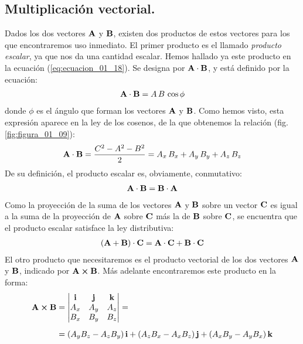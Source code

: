 \documentclass[12pt]{article}
\begin{document}
\subsection{Multiplicación vectorial.}

Dados los dos vectores $\vb{A}$ y $\vb{B}$, existen dos productos de estos vectores para los que encontraremos uso inmediato. El primer producto es el llamado \emph{producto escalar}, ya que nos da una cantidad escalar. Hemos hallado ya este producto en la ecuación (\ref{eq:ecuacion_01_18}). Se designa por $\vb{A} \cdot \vb{B}$, y está definido por la ecuación:
\begin{align}
    \vb{A} \cdot \vb{B} = A \, B \, \cos \phi
    \label{eq:ecuacion_01_20}
\end{align}
donde $\phi$ es el ángulo que forman los vectores $\vb{A}$ y $\vb{B}$. Como hemos visto, esta expresión aparece en la ley de los cosenos, de la que obtenemos la relación (fig. \ref{fig:figura_01_09}):
\begin{align}
    \vb{A} \cdot \vb{B} = \dfrac{C^{2} - A^{2} - B^{2}}{2} = A_{x} \, B_{x} + A_{y} \, B_{y} + A_{z} \, B_{z}
    \label{eq:ecuacion_01_21}
\end{align}
De su definición, el producto escalar es, obviamente, conmutativo:
\begin{align*}
    \vb{A} \cdot \vb{B} = \vb{B} \cdot \vb{A}
\end{align*}
Como la proyección de la suma de los vectores $\vb{A}$ y $\vb{B}$ sobre un vector $\vb{C}$ es igual a la suma de la proyección de $\vb{A}$ sobre $\vb{C}$ más la de $\vb{B}$ sobre $\vb{C}$, se encuentra que el producto escalar satisface la ley distributiva:
\begin{align*}
\left( \vb{A} + \vb{B} \right) \cdot \vb{C} = \vb{A} \cdot \vb{C} + \vb{B} \cdot \vb{C}
\end{align*}
El otro producto que necesitaremos es el producto vectorial de los dos vectores $\vb{A}$ y $\vb{B}$, indicado por $\vb{A} \cp \vb{B}$. Más adelante encontraremos este producto en la forma:
\begin{align}
\begin{aligned}[b]
\vb{A} \cp \vb{B} &= \mdet{
    \vb{i} & \vb{j} & \vb{k} \\
    A_{x} & A_{y} & A_{z} \\
    B_{x} & B_{y} & B_{z} } = \\[0.5em]
    &= \left( A_{y} B_{z} - A_{z} B_{y} \right) \vb{i} + \left( A_{z} B_{x} - A_{x} B_{z} \right) \vb{j} + \left( A_{x} B_{y} - A_{y} B_{x} \right) \vb{k}
\end{aligned}
\label{eq:ecuacion_01_22}
\end{align}
\end{document}
